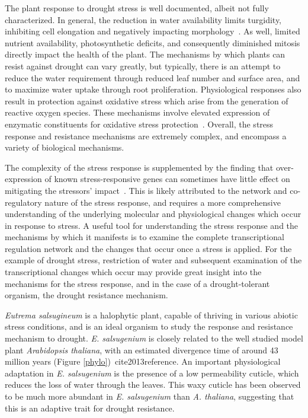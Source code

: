 \documentclass[12pt]{article}
\newcommand{\esal}{\textit{E. salsugenium}}
\begin{document}
	The plant response to drought stress is well documented, albeit not fully characterized. In general, the reduction in water availability limits turgidity, inhibiting cell elongation and negatively impacting morphology~\cite{farooq2009plant}. As well, limited nutrient availability, photosynthetic deficits, and consequently diminished mitosis directly impact the health of the plant. 
	The mechanisms by which plants can resist against drought can vary greatly, but typically, there is an attempt to reduce the water requirement through reduced leaf number and surface area, and to maximize water uptake through root proliferation. Physiological responses also result in protection against oxidative stress which arise from the generation of reactive oxygen species. These mechanisms involve elevated expression of enzymatic constituents for oxidative stress protection~\cite{farooq2009plant}. Overall, the stress response and resistance mechanisms are extremely complex, and encompass a variety of biological mechanisms. 
	
	The complexity of the stress response is supplemented by the finding that over-expression of known stress-responsive genes can sometimes have little effect on mitigating the stressors' impact~\cite{bartels2005}. This is likely attributed to the network and co-regulatory nature of the stress response, and requires a more comprehensive understanding of the underlying molecular and physiological changes which occur in response to stress. A useful tool for understanding the stress response and the mechanisms by which it manifests is to examine the complete transcriptional regulation network and the changes that occur once a stress is applied. For the example of drought stress, restriction of water and subsequent examination of the transcriptional changes which occur may provide great insight into the mechanisms for the stress response, and in the case of a drought-tolerant organism, the drought resistance mechanism. 
	
	\textit{Eutrema salsugineum} is a halophytic plant, capable of thriving in various abiotic stress conditions, and is an ideal organism to study the response and resistance mechanism to drought. \esal{} is closely related to the well studied model plant \textit{Arabidopsis thaliana}, with an estimated divergence time of around 43 million years (Figure \ref{phylo})~cite{\yang2013reference}. An important physiological adaptation in \esal{} is the presence of a low permeability cuticle, which reduces the loss of water through the leaves. This waxy cuticle has been observed to be much more abundant in \esal{} than \textit{A. thaliana}, suggesting that this is an adaptive trait for drought resistance. 
	
\end{document}
